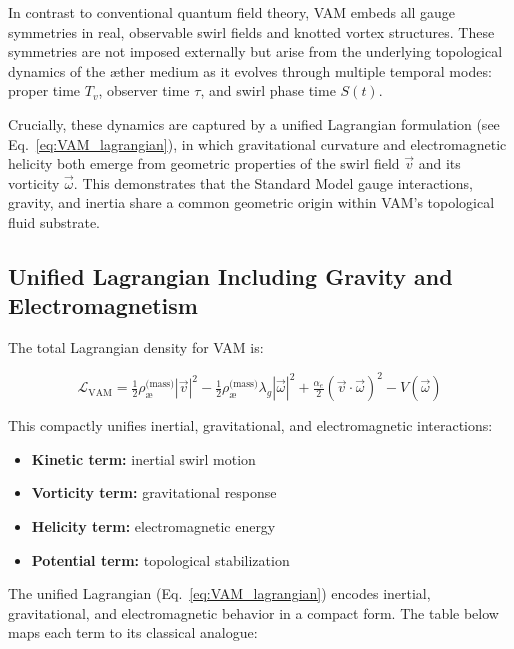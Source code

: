 \documentclass[12pt]{article}
\begin{document}
     In contrast to conventional quantum field theory, VAM embeds all gauge symmetries in real, observable swirl fields and knotted vortex structures. These symmetries are not imposed externally but arise from the underlying topological dynamics of the æther medium as it evolves through multiple temporal modes: proper time \( T_v \), observer time \( \tau \), and swirl phase time \( S(t) \).

    Crucially, these dynamics are captured by a unified Lagrangian formulation (see Eq.~\eqref{eq:VAM_lagrangian}), in which gravitational curvature and electromagnetic helicity both emerge from geometric properties of the swirl field \( \vec{v} \) and its vorticity \( \vec{\omega} \). This demonstrates that the Standard Model gauge interactions, gravity, and inertia share a common geometric origin within VAM's topological fluid substrate.

      \subsection*{Unified Lagrangian Including Gravity and Electromagnetism}

        The total Lagrangian density for VAM is:

        \begin{equation}
        \mathcal{L}_{\text{VAM}} = \tfrac{1}{2} \rho_{\text{\ae}}^{\text{(mass)}} |\vec{v}|^2 - \tfrac{1}{2} \rho_{\text{\ae}}^{\text{(mass)}} \lambda_g |\vec{\omega}|^2 + \tfrac{\alpha_e}{2} (\vec{v} \cdot \vec{\omega})^2 - V(\vec{\omega})
        \label{eq:VAM_lagrangian}
        \end{equation}

        This compactly unifies inertial, gravitational, and electromagnetic interactions:
         \begin{itemize}
        \item \textbf{Kinetic term:} inertial swirl motion
        \item \textbf{Vorticity term:} gravitational response
        \item \textbf{Helicity term:} electromagnetic energy
        \item \textbf{Potential term:} topological stabilization
        \end{itemize}

    The unified Lagrangian (Eq.~\ref{eq:VAM_lagrangian}) encodes inertial, gravitational, and electromagnetic behavior in a compact form. The table below maps each term to its classical analogue:
\end{document}
